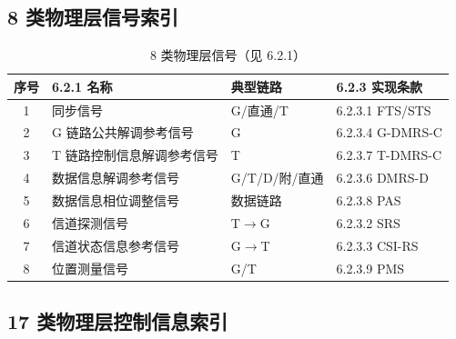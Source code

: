 \documentclass[11pt,a4paper]{ctexart}
\begin{document}
\subsection{8 类物理层信号索引}

\begin{table}[h]
\centering
\small
\begin{tabular}{clll}
\toprule
\textbf{序号} & \textbf{6.2.1 名称} & \textbf{典型链路} & \textbf{6.2.3 实现条款} \\
\midrule
1 & 同步信号 & G/直通/T & 6.2.3.1 FTS/STS \\
2 & G 链路公共解调参考信号 & G & 6.2.3.4 G-DMRS-C \\
3 & T 链路控制信息解调参考信号 & T & 6.2.3.7 T-DMRS-C \\
4 & 数据信息解调参考信号 & G/T/D/附/直通 & 6.2.3.6 DMRS-D \\
5 & 数据信息相位调整信号 & 数据链路 & 6.2.3.8 PAS \\
6 & 信道探测信号 & T$\rightarrow$G & 6.2.3.2 SRS \\
7 & 信道状态信息参考信号 & G$\rightarrow$T & 6.2.3.3 CSI-RS \\
8 & 位置测量信号 & G/T & 6.2.3.9 PMS \\
\bottomrule
\end{tabular}
\caption{8 类物理层信号（见 6.2.1）}
\end{table}

\subsection{17 类物理层控制信息索引}
\end{document}
